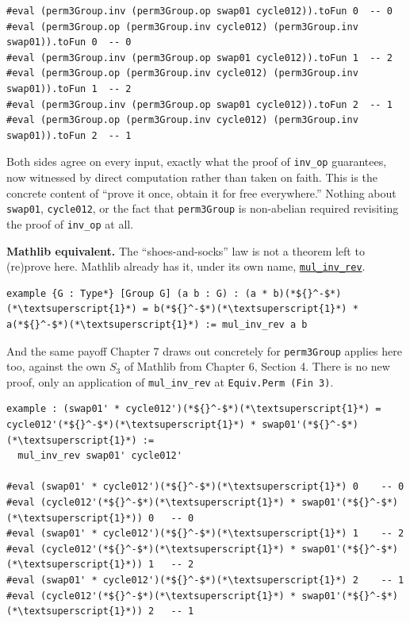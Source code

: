 \begin{lstlisting}
#eval (perm3Group.inv (perm3Group.op swap01 cycle012)).toFun 0  -- 0
#eval (perm3Group.op (perm3Group.inv cycle012) (perm3Group.inv swap01)).toFun 0  -- 0
#eval (perm3Group.inv (perm3Group.op swap01 cycle012)).toFun 1  -- 2
#eval (perm3Group.op (perm3Group.inv cycle012) (perm3Group.inv swap01)).toFun 1  -- 2
#eval (perm3Group.inv (perm3Group.op swap01 cycle012)).toFun 2  -- 1
#eval (perm3Group.op (perm3Group.inv cycle012) (perm3Group.inv swap01)).toFun 2  -- 1
\end{lstlisting}

Both sides agree on every input, exactly what the proof of \texttt{inv\_\allowbreak{}op} guarantees, now witnessed by direct computation rather than taken on faith. This is the concrete content of ``prove it once, obtain it for free everywhere.'' Nothing about \texttt{swap01}, \texttt{cycle012}, or the fact that \texttt{perm3Group} is non-abelian required revisiting the proof of \texttt{inv\_\allowbreak{}op} at all.

\textbf{Mathlib equivalent.} The ``shoes-and-socks'' law is not a theorem left to (re)prove here. Mathlib already has it, under its own name, \href{https://loogle.lean-lang.org/?q=mul_inv_rev}{\texttt{mul\_\allowbreak{}inv\_\allowbreak{}rev}}.

\begin{lstlisting}
example {G : Type*} [Group G] (a b : G) : (a * b)(*${}^-$*)(*\textsuperscript{1}*) = b(*${}^-$*)(*\textsuperscript{1}*) * a(*${}^-$*)(*\textsuperscript{1}*) := mul_inv_rev a b
\end{lstlisting}

And the same payoff Chapter 7 draws out concretely for \texttt{perm3Group} applies here too, against the own \(S_3\) of Mathlib from Chapter 6, Section 4. There is no new proof, only an application of \texttt{mul\_\allowbreak{}inv\_\allowbreak{}rev} at \texttt{Equiv.Perm (Fin 3)}.

\begin{lstlisting}
example : (swap01' * cycle012')(*${}^-$*)(*\textsuperscript{1}*) = cycle012'(*${}^-$*)(*\textsuperscript{1}*) * swap01'(*${}^-$*)(*\textsuperscript{1}*) :=
  mul_inv_rev swap01' cycle012'

#eval (swap01' * cycle012')(*${}^-$*)(*\textsuperscript{1}*) 0    -- 0
#eval (cycle012'(*${}^-$*)(*\textsuperscript{1}*) * swap01'(*${}^-$*)(*\textsuperscript{1}*)) 0   -- 0
#eval (swap01' * cycle012')(*${}^-$*)(*\textsuperscript{1}*) 1    -- 2
#eval (cycle012'(*${}^-$*)(*\textsuperscript{1}*) * swap01'(*${}^-$*)(*\textsuperscript{1}*)) 1   -- 2
#eval (swap01' * cycle012')(*${}^-$*)(*\textsuperscript{1}*) 2    -- 1
#eval (cycle012'(*${}^-$*)(*\textsuperscript{1}*) * swap01'(*${}^-$*)(*\textsuperscript{1}*)) 2   -- 1
\end{lstlisting}

